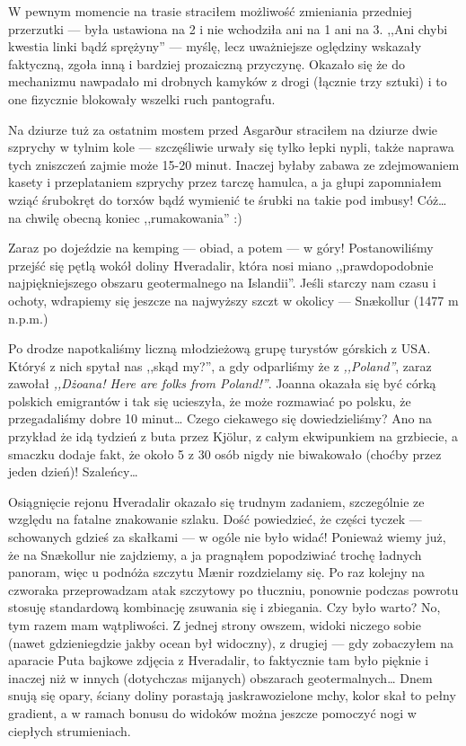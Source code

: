 W pewnym momencie na trasie straciłem możliwość zmieniania przedniej przerzutki --- była ustawiona na 2 i nie wchodziła ani na 1 ani na 3. ,,Ani chybi kwestia linki bądź sprężyny'' --- myślę, lecz uważniejsze oględziny wskazały faktyczną, zgoła inną i bardziej prozaiczną przyczynę. Okazało się że do mechanizmu nawpadało mi drobnych kamyków z drogi (łącznie trzy sztuki) i to one fizycznie blokowały wszelki ruch pantografu.

Na dziurze tuż za ostatnim mostem przed Asgarður straciłem na dziurze dwie szprychy w tylnim kole --- szczęśliwie urwały się tylko łepki nypli, także naprawa tych zniszczeń zajmie może 15-20 minut. Inaczej byłaby zabawa ze zdejmowaniem kasety i przeplataniem szprychy przez tarczę hamulca, a ja głupi zapomniałem wziąć śrubokręt do torxów bądź wymienić te śrubki na takie pod imbusy! Cóż… na chwilę obecną koniec ,,rumakowania'' :)


Zaraz po dojeździe na kemping --- obiad, a potem --- w góry! Postanowiliśmy przejść się pętlą wokół doliny Hveradalir, która nosi miano ,,prawdopodobnie najpiękniejszego obszaru geotermalnego na Islandii''. Jeśli starczy nam czasu i ochoty, wdrapiemy się jeszcze na najwyższy szczt w okolicy --- Snækollur (1477 m n.p.m.)

Po drodze napotkaliśmy liczną młodzieżową grupę turystów górskich z USA. Któryś z nich spytał nas ,,skąd my?'', a gdy odparliśmy że z \emph{,,Poland''}, zaraz zawołał \emph{,,Dżoana! Here are folks from Poland!''}. Joanna okazała się być córką polskich emigrantów i tak się ucieszyła, że może rozmawiać po polsku, że przegadaliśmy dobre 10 minut… Czego ciekawego się dowiedzieliśmy? Ano na przykład że idą tydzień z buta przez Kjölur, z całym ekwipunkiem na grzbiecie, a smaczku dodaje fakt, że około 5 z 30 osób nigdy nie biwakowało (choćby przez jeden dzień)! Szaleńcy…


Osiągnięcie rejonu Hveradalir okazało się trudnym zadaniem, szczególnie ze względu na fatalne znakowanie szlaku. Dość powiedzieć, że części tyczek --- schowanych gdzieś za skałkami --- w ogóle nie było widać! Ponieważ wiemy już, że na Snækollur nie zajdziemy, a ja pragnąłem popodziwiać trochę ładnych panoram, więc u podnóża szczytu Mænir rozdzielamy się. Po raz kolejny na czworaka przeprowadzam atak szczytowy po tłuczniu, ponownie podczas powrotu stosuję standardową kombinację zsuwania się i zbiegania. Czy było warto? No, tym razem mam wątpliwości. Z jednej strony owszem, widoki niczego sobie (nawet gdzieniegdzie jakby ocean był widoczny), z drugiej --- gdy zobaczyłem na aparacie Puta bajkowe zdjęcia z Hveradalir, to faktycznie tam było pięknie i inaczej niż w innych (dotychczas mijanych) obszarach geotermalnych… Dnem snują się opary, ściany doliny porastają jaskrawozielone mchy, kolor skał to pełny gradient, a w ramach bonusu do widoków można jeszcze pomoczyć nogi w ciepłych strumieniach.


